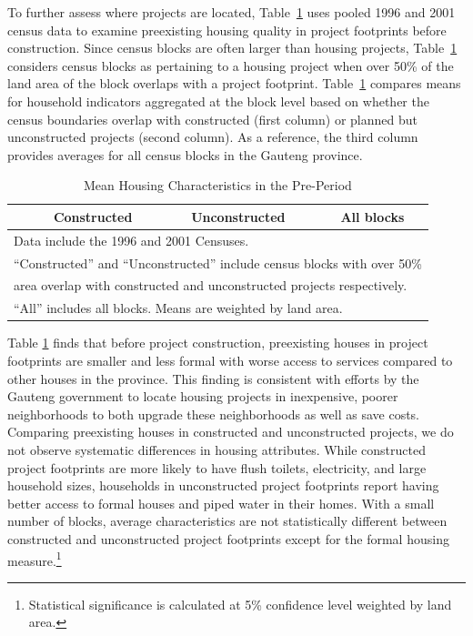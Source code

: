 \documentclass[12pt]{article}
\begin{document}
To further assess where projects are located, Table~\ref{table:projectdescriptivescensus} uses pooled 1996 and 2001 census data to examine preexisting housing quality in project footprints before construction.  Since census blocks are often larger than housing projects, Table~\ref{table:projectdescriptivescensus} considers census blocks as pertaining to a housing project when over 50\% of the land area of the block overlaps with a project footprint.  Table~\ref{table:projectdescriptivescensus} compares means for household indicators aggregated at the block level based on whether the census boundaries overlap with constructed (first column) or planned but unconstructed projects (second column).  As a reference, the third column provides averages for all census blocks in the Gauteng province.

\begin{table}[h!]
	\centering
	\caption{Mean Housing Characteristics in the Pre-Period}\label{table:projectdescriptivescensus}
\vspace{-2mm}
\begin{tabular}{l*{1}{ccc}}
\toprule
& Constructed & Unconstructed & All blocks \\
\midrule
 
\bottomrule
\multicolumn{4}{l}{\scriptsize  Data include the 1996 and 2001 Censuses. } \\ [-.5em]
\multicolumn{4}{l}{\scriptsize ``Constructed'' and ``Unconstructed'' include census blocks with over 50\% } \\ [-.5em]
\multicolumn{4}{l}{\scriptsize  area overlap with constructed and unconstructed projects respectively. } \\ [-.5em]
\multicolumn{4}{l}{\scriptsize ``All''  includes all blocks.  Means are weighted by land area.}
\end{tabular}
\end{table}


Table \ref{table:projectdescriptivescensus} finds that before project construction, preexisting houses in project footprints are smaller and less formal with worse access to services compared to other houses in the province.  This finding is consistent with efforts by the Gauteng government to locate housing projects in inexpensive, poorer neighborhoods to both upgrade these neighborhoods as well as save costs.  Comparing preexisting houses in constructed and unconstructed projects, we do not observe systematic differences in housing attributes.  While constructed project footprints are more likely to have flush toilets, electricity, and large household sizes, households in unconstructed project footprints report having better access to formal houses and piped water in their homes.  With a small number of blocks, average characteristics are not statistically different between constructed and unconstructed project footprints except for the formal housing measure.\footnote{Statistical significance is calculated at 5\% confidence level weighted by land area.}
\end{document}
